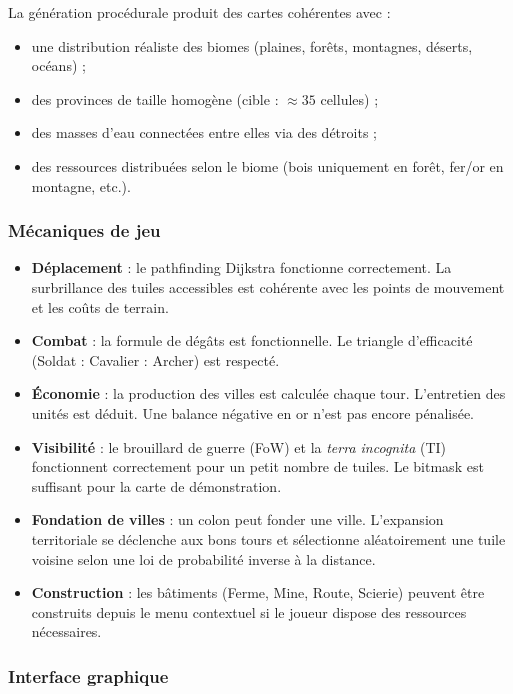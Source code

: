 \documentclass[12pt, a4paper]{article}
\begin{document}
La génération procédurale produit des cartes cohérentes avec :
\begin{itemize}
    \item une distribution réaliste des biomes (plaines, forêts, montagnes, déserts, océans) ;
    \item des provinces de taille homogène (cible : $\approx 35$ cellules) ;
    \item des masses d'eau connectées entre elles via des détroits ;
    \item des ressources distribuées selon le biome (bois uniquement en forêt, fer/or en montagne, etc.).
\end{itemize}

\subsubsection{Mécaniques de jeu}

\begin{itemize}
    \item \textbf{Déplacement} : le pathfinding Dijkstra fonctionne correctement. La surbrillance
    des tuiles accessibles est cohérente avec les points de mouvement et les coûts de terrain.
    \item \textbf{Combat} : la formule de dégâts est fonctionnelle. Le triangle d'efficacité
    (Soldat : Cavalier : Archer) est respecté.
    \item \textbf{Économie} : la production des villes est calculée chaque tour. L'entretien
    des unités est déduit. Une balance négative en or n'est pas encore pénalisée.
    \item \textbf{Visibilité} : le brouillard de guerre (FoW) et la \textit{terra incognita} (TI)
    fonctionnent correctement pour un petit nombre de tuiles. Le bitmask est suffisant pour la
    carte de démonstration.
    \item \textbf{Fondation de villes} : un colon peut fonder une ville. L'expansion territoriale
    se déclenche aux bons tours et sélectionne aléatoirement une tuile voisine selon une loi de
    probabilité inverse à la distance.
    \item \textbf{Construction} : les bâtiments (Ferme, Mine, Route, Scierie) peuvent être
    construits depuis le menu contextuel si le joueur dispose des ressources nécessaires.
\end{itemize}

\subsubsection{Interface graphique}
\end{document}
